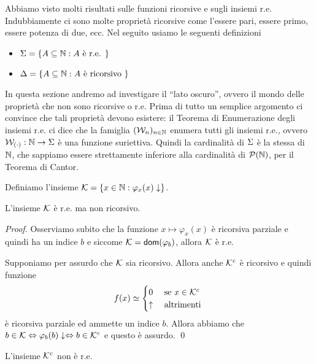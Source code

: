 \documentclass[runningheads,a4paper]{llncs}
\begin{document}
Abbiamo visto molti risultati sulle funzioni ricorsive e sugli insiemi r.e. Indubbiamente ci sono molte propriet\`{a} ricorsive 
 come l'essere pari, essere primo, essere potenza di due, ecc. Nel seguito usiamo le seguenti definizioni
\begin{itemize}
\item $\Sigma = \{A \subseteq \mathbb{N} : A \mbox{ \`{e} r.e. }\}$
\item $\Delta = \{A \subseteq \mathbb{N} : A \mbox{ \`{e} ricorsivo }\}$
\end{itemize}

In questa sezione andremo ad investigare il ``lato oscuro'', ovvero il mondo delle propriet\`{a} che non sono ricorsive o r.e.
 Prima di tutto un semplice argomento ci convince che tali propriet\`{a} devono esistere: il Teorema di Enumerazione degli insiemi 
 r.e. ci dice che la famiglia $(\mathcal{W}_n)_{n \in \mathbb{N}}$ enumera tutti gli insiemi r.e., ovvero $\mathcal{W}_{(\cdot)}: \mathbb{N} \to \Sigma$ \`{e} una
 funzione suriettiva. Quindi la cardinalit\`{a} di $\Sigma$ \`{e} la stessa di $\mathbb{N}$, che sappiamo essere strettamente inferiore
 alla cardinalit\`{a} di $\mathcal{P}(\mathbb{N})$, per il Teorema di Cantor.

\begin{definition}
Definiamo l'insieme $\mathcal{K} = \{x \in \mathbb{N} : \varphi_x(x)\downarrow \}$.
\end{definition}

\begin{theorem}\label{thm:Kre}
L'insieme $\mathcal{K}$ \`{e} r.e. ma non ricorsivo.
\end{theorem}

\begin{proof}
Osserviamo subito che la funzione $x \mapsto \varphi_x(x)$ \`{e} ricorsiva parziale e quindi ha un indice $b$ e siccome
 $\mathcal{K} = \mathsf{dom}(\varphi_b)$, allora $\mathcal{K}$ \`{e} r.e.

Supponiamo per assurdo che $\mathcal{K}$ sia ricorsivo. Allora anche $\mathcal{K}^c$ \`{e} ricorsivo e quindi funzione
$$
f(x) \simeq 
\begin{cases}
0        & \mbox{ se $x \in \mathcal{K}^c$} \\
\uparrow & \mbox{ altrimenti } \\
\end{cases}
$$
\`{e} ricorsiva parziale ed ammette un indice $b$. Allora abbiamo che $b \in \mathcal{K} \Leftrightarrow \varphi_b(b)\downarrow \Leftrightarrow b \in \mathcal{K}^c$ e 
 questo \`{e} assurdo.
\qed\end{proof}

\begin{corollary}\label{cor:Kre}
L'insieme $\mathcal{K}^c$ non \`{e} r.e.
\end{corollary}
\end{document}
